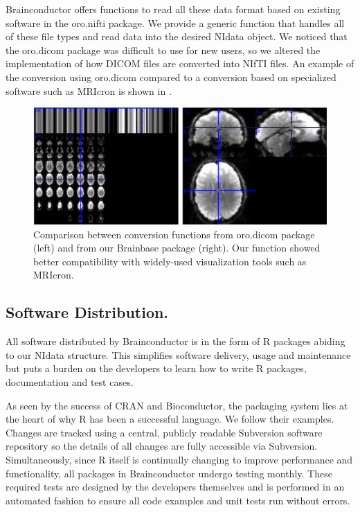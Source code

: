 \documentclass{nature}
\begin{document}
Brainconductor offers functions to read all these data format
based on existing software in the oro.nifti package. We
provide a generic function that handles all of these file types and read data
into the desired NIdata object.
We noticed that the oro.dicom package was difficult to use for new users, so
we altered the implementation of how DICOM files are converted into NIfTI 
files. An example of the conversion using oro.dicom compared to a conversion
based on specialized software such as MRIcron\cite{rorden2011mricro} is
shown in .

\begin{figure}[tb]
\centering
\includegraphics[width=400pt]{fig/brainconductor/dicom.png}

\caption{Comparison between conversion functions from oro.dicom package (left)
and from our Brainbase  package (right).  Our function showed better
compatibility  with widely-used visualization tools such as MRIcron.}
\label{fig:dicom}
\end{figure}

\subsection{Software Distribution.}

All software distributed by Brainconductor is in the form of R packages abiding
to our NIdata structure. This
simplifies software delivery, usage and maintenance but puts a burden on the
developers
to learn how to write R packages, documentation and test cases.

As seen by the success of CRAN and Bioconductor, the packaging system lies
at the heart of why R has been a successful language. We follow their examples.
Changes are tracked using a central, publicly readable Subversion software
repository
so the details of all changes are fully accessible via Subversion.
Simultaneously, since
R itself is continually changing to improve performance and functionality, all
packages
in Brainconductor undergo testing monthly. These required tests are designed by
the
developers themselves and is performed in an automated fashion to ensure
all code examples and unit tests run without errors.
\end{document}
